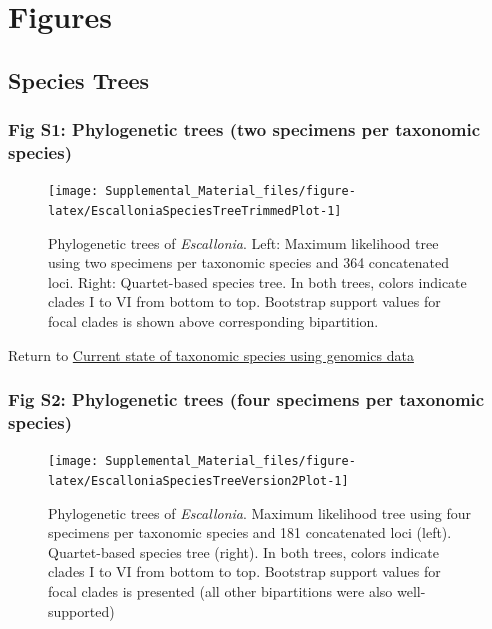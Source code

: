 \documentclass[
  11pt,
]{article}
\begin{document}
\hypertarget{figures}{%
\section{Figures}\label{figures}}

\hypertarget{species-trees}{%
\subsection{Species Trees}\label{species-trees}}

\hypertarget{fig-s1-phylogenetic-trees-two-specimens-per-taxonomic-species}{%
\subsubsection{Fig S1: Phylogenetic trees (two specimens per taxonomic species)}\label{fig-s1-phylogenetic-trees-two-specimens-per-taxonomic-species}}

\begin{figure}
\texttt{[image: Supplemental\_Material\_files/figure-latex/EscalloniaSpeciesTreeTrimmedPlot-1]} \caption{Phylogenetic trees of \textit{Escallonia}. Left: Maximum likelihood tree using two specimens per taxonomic species and 364 concatenated loci. Right: Quartet-based species tree. In both trees, colors indicate clades I to VI from bottom to top. Bootstrap support values for focal clades is shown above corresponding bipartition.}\label{fig:EscalloniaSpeciesTreeTrimmedPlot}
\end{figure}

Return to \protect\hyperlink{current-state-of-taxonomic-species-using-genomics-data}{Current state of taxonomic species using genomics data}
\pagebreak

\hypertarget{fig-s2-phylogenetic-trees-four-specimens-per-taxonomic-species}{%
\subsubsection{Fig S2: Phylogenetic trees (four specimens per taxonomic species)}\label{fig-s2-phylogenetic-trees-four-specimens-per-taxonomic-species}}

\begin{figure}
\texttt{[image: Supplemental\_Material\_files/figure-latex/EscalloniaSpeciesTreeVersion2Plot-1]} \caption{Phylogenetic trees of \textit{Escallonia}. Maximum likelihood tree using four specimens per taxonomic species and 181 concatenated loci (left). Quartet-based species tree (right). In both trees, colors indicate clades I to VI from bottom to top. Bootstrap support values for focal clades is presented (all other bipartitions were also well-supported)}\label{fig:EscalloniaSpeciesTreeVersion2Plot}
\end{figure}
\end{document}
